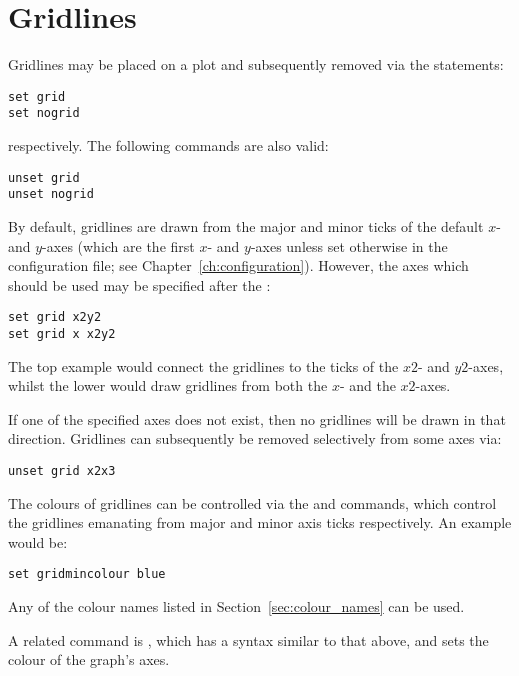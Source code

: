 \section{Gridlines}

Gridlines may be placed on a plot and subsequently removed via the statements:

\begin{verbatim}
set grid
set nogrid
\end{verbatim}

\noindent respectively. The following commands are also valid:

\begin{verbatim}
unset grid
unset nogrid
\end{verbatim}

\noindent By default, gridlines are drawn from the major and minor ticks of the
default $x$- and $y$-axes (which are the first $x$- and $y$-axes unless set
otherwise in the configuration file; see Chapter~\ref{ch:configuration}).
However, the axes which should be used may be specified after the :

\begin{verbatim}
set grid x2y2
set grid x x2y2
\end{verbatim}

\noindent The top example would connect the gridlines to the ticks of the $x2$-
and $y2$-axes, whilst the lower would draw gridlines from both the $x$- and the
$x2$-axes.

If one of the specified axes does not exist, then no gridlines will be drawn in
that direction.  Gridlines can subsequently be removed selectively from some
axes via:

\begin{verbatim}
unset grid x2x3
\end{verbatim}

The colours of gridlines can be
controlled via the  and  commands, which control the gridlines emanating from major and
minor axis ticks respectively. An example would be:

\begin{verbatim}
set gridmincolour blue
\end{verbatim}

\noindent Any of the colour names listed in Section~\ref{sec:colour_names} can
be used.

A related command is , which has a syntax similar to that above, and sets the colour of
the graph's axes.\label{sec:set_colours}

